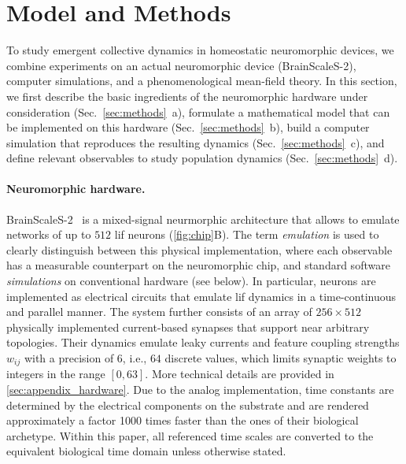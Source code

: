 \section{\label{sec:methods}Model and Methods}

To study emergent collective dynamics in homeostatic neuromorphic devices, we combine experiments on an actual neuromorphic device (BrainScaleS-2), computer simulations, and a phenomenological mean-field theory. In this section, we first describe the basic ingredients of the neuromorphic hardware under consideration (Sec.~\ref{sec:methods}~a), formulate a mathematical model that can be implemented on this hardware (Sec.~\ref{sec:methods}~b), build a computer simulation that reproduces the resulting dynamics (Sec.~\ref{sec:methods}~c), and define relevant observables to study population dynamics (Sec.~\ref{sec:methods}~d).

\paragraph{Neuromorphic hardware.}
\label{sec:brainscale}
BrainScaleS-2~\cite{friedmann_demonstrating_2017,schemmel_accelerated_2022,pehle_brainscales-2_2022} is a mixed-signal neurmorphic architecture that allows to emulate networks of up to $512$ \gls{lif} neurons (\cref{fig:chip}B).
The term \textit{emulation} is used to clearly distinguish between this physical implementation, where each observable has a measurable counterpart on the neuromorphic chip, and standard software \textit{simulations} on conventional hardware (see below).
In particular, neurons are implemented as electrical circuits that emulate \gls{lif} dynamics in a time-continuous and parallel manner.
The system further consists of an array of $256 \times 512$ physically implemented current-based synapses that support near arbitrary topologies.
Their dynamics emulate leaky currents and feature coupling strengths $w_{ij}$ with a precision of \SI{6}{\bit}, i.e., $64$ discrete values, which limits synaptic weights to integers in the range $[0,63]$.
More technical details are provided in \cref{sec:appendix_hardware}.
Due to the analog implementation, time constants are determined by the electrical components on the substrate and are rendered approximately a factor \num{1000} times faster than the ones of their biological archetype.
Within this paper, all referenced time scales are converted to the equivalent biological time domain unless otherwise stated.

